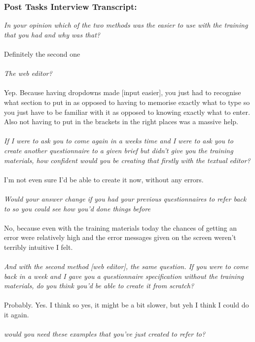 \subsubsection*{Post Tasks Interview Transcript:}
\textit{In your opinion which of the two methods was the easier to use with the training that you had and why was that? } \\
\\
Definitely the second one
\\
\\
\textit{The web editor?}
\\
\\
Yep. Because having dropdowns made [input easier], you just had to recognise what section to put in as opposed to having to memorise exactly what to type so you just have to be familiar with it as opposed to knowing exactly what to enter. Also not having to put in the brackets in the right places was a massive help.
\\
\\
\textit{If I were to ask you to come again in a weeks time and I were to ask you to create another questionnaire to a given brief but didn't give you the training materials, how confident would you be creating that firstly with the textual editor?}
\\
\\
I'm not even sure I'd be able to create it now, without any errors.
\\
\\
\textit{Would your answer change if you had your previous questionnaires to refer back to so you could see how you'd done things before}\\
\\
No, because even with the training materials today the chances of getting an error were relatively high and the error messages given on the screen weren't terribly intuitive I felt.
\\
\\
\textit{And with the second method [web editor], the same question. If you were to come back in a week and I gave you a questionnaire specification without the training materials, do you think you'd be able to create it from scratch?}
\\
\\
Probably. Yes. I think so yes, it might be a bit slower, but yeh I think I could do it again.
\\
\\
\textit{would you need these examples that you've just created to refer to?}
